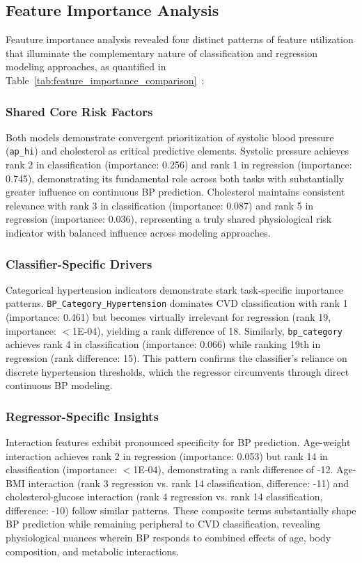 \documentclass[conference]{IEEEtran}
\begin{document}
\subsection{Feature Importance Analysis}
Feauture importance analysis revealed four distinct patterns of feature utilization that illuminate the complementary nature of classification and regression modeling approaches, as quantified in Table~\ref{tab:feature_importance_comparison}~\cite{lundberg2017unified}:

\subsubsection{Shared Core Risk Factors} 
Both models demonstrate convergent prioritization of systolic blood pressure (\texttt{ap\_hi}) and cholesterol as critical predictive elements. Systolic pressure achieves rank 2 in classification (importance: 0.256) and rank 1 in regression (importance: 0.745), demonstrating its fundamental role across both tasks with substantially greater influence on continuous BP prediction. Cholesterol maintains consistent relevance with rank 3 in classification (importance: 0.087) and rank 5 in regression (importance: 0.036), representing a truly shared physiological risk indicator with balanced influence across modeling approaches.

\subsubsection{Classifier-Specific Drivers} 
Categorical hypertension indicators demonstrate stark task-specific importance patterns. \texttt{BP\_Category\_Hypertension} dominates CVD classification with rank 1 (importance: 0.461) but becomes virtually irrelevant for regression (rank 19, importance: $<$1E-04), yielding a rank difference of 18. Similarly, \texttt{bp\_category} achieves rank 4 in classification (importance: 0.066) while ranking 19th in regression (rank difference: 15). This pattern confirms the classifier's reliance on discrete hypertension thresholds, which the regressor circumvents through direct continuous BP modeling.

\subsubsection{Regressor-Specific Insights} 
Interaction features exhibit pronounced specificity for BP prediction. Age-weight interaction achieves rank 2 in regression (importance: 0.053) but rank 14 in classification (importance: $<$1E-04), demonstrating a rank difference of -12. Age-BMI interaction (rank 3 regression vs. rank 14 classification, difference: -11) and cholesterol-glucose interaction (rank 4 regression vs. rank 14 classification, difference: -10) follow similar patterns. These composite terms substantially shape BP prediction while remaining peripheral to CVD classification, revealing physiological nuances wherein BP responds to combined effects of age, body composition, and metabolic interactions.
\end{document}
